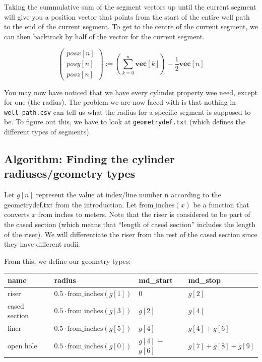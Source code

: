 Taking the cummulative sum of the segment vectors up until the current
segment will give you a position vector that points from the start of
the entire well path to the end of the current segment. To get to the
centre of the current segment, we can then backtrack by half of the
vector for the current segment.

\[
\begin{pmatrix}
posx[n]\\
posy[n]\\
posz[n]
\end{pmatrix}:=\left(\sum_{k=0}^{n}{ \mathbf{vec}[k] }\right) - \frac{1}{2}\mathbf{vec}[n] 
\]

You may now have noticed that we have every cylinder property wee need,
except for one (the radius). The problem we are now faced with is that
nothing in \texttt{well\_path.csv} can tell us what the radius for a
specific segment is supposed to be. To figure out this, we have to look
at \texttt{geometrydef.txt} (which defines the different types of
segments).

\hypertarget{algorithm-finding-the-cylinder-radiusesgeometry-types}{%
\subsection{Algorithm: Finding the cylinder radiuses/geometry
types}\label{algorithm-finding-the-cylinder-radiusesgeometry-types}}

Let \(g[n]\) represent the value at index/line number n according to the
geometrydef.txt from the introduction. Let \(\text{from\_inches}(x)\) be
a function that converts \(x\) from inches to meters. Note that the
riser is considered to be part of the cased section (which means that
``length of cased section'' includes the length of the riser). We will
differentiate the riser from the rest of the cased section since they
have different radii.

From this, we define our geometry types:

\begin{longtable}[]{@{}llll@{}}
\toprule
name & radius & md\_start & md\_stop\tabularnewline
\midrule
\endhead
riser & \(0.5 \cdot \text{from\_inches}(g[1])\) & 0 &
\(g[2]\)\tabularnewline
cased section & \(0.5 \cdot \text{from\_inches}(g[3])\) & \(g[2]\) &
\(g[4]\)\tabularnewline
liner & \(0.5 \cdot \text{from\_inches}(g[5])\) & \(g[4]\) &
\(g[4]+g[6]\)\tabularnewline
open hole & \(0.5 \cdot \text{from\_inches}(g[0])\) & \(g[4]\) +
\(g[6]\) & \(g[7]+g[8]+g[9]\)\tabularnewline
\bottomrule
\end{longtable}

